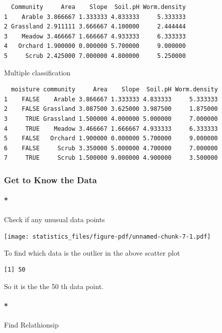 \documentclass[
  letterpaper,
  DIV=11,
  numbers=noendperiod]{scrreprt}
\let\oldparagraph\paragraph
\renewcommand{\paragraph}[1]{\oldparagraph{#1}\mbox{}}
\begin{document}
\begin{verbatim}
  Community     Area    Slope  Soil.pH Worm.density
1    Arable 3.866667 1.333333 4.833333     5.333333
2 Grassland 2.911111 3.666667 4.100000     2.444444
3    Meadow 3.466667 1.666667 4.933333     6.333333
4   Orchard 1.900000 0.000000 5.700000     9.000000
5     Scrub 2.425000 7.000000 4.800000     5.250000
\end{verbatim}

Multiple classification

\begin{verbatim}
  moisture community     Area    Slope  Soil.pH Worm.density
1    FALSE    Arable 3.866667 1.333333 4.833333     5.333333
2    FALSE Grassland 3.087500 3.625000 3.987500     1.875000
3     TRUE Grassland 1.500000 4.000000 5.000000     7.000000
4     TRUE    Meadow 3.466667 1.666667 4.933333     6.333333
5    FALSE   Orchard 1.900000 0.000000 5.700000     9.000000
6    FALSE     Scrub 3.350000 5.000000 4.700000     7.000000
7     TRUE     Scrub 1.500000 9.000000 4.900000     3.500000
\end{verbatim}

\subsubsection*{Get to Know the Data}\label{get-to-know-the-data}

\paragraph*{Check if any unusual data
points}\label{check-if-any-unusual-data-points}

\texttt{[image: statistics\_files/figure-pdf/unnamed-chunk-7-1.pdf]}

To find which data is the outlier in the above scatter plot

\begin{verbatim}
[1] 50
\end{verbatim}

So it is the the 50 th data point.

\paragraph*{Find Relathionsip}\label{find-relathionsip}
\end{document}
